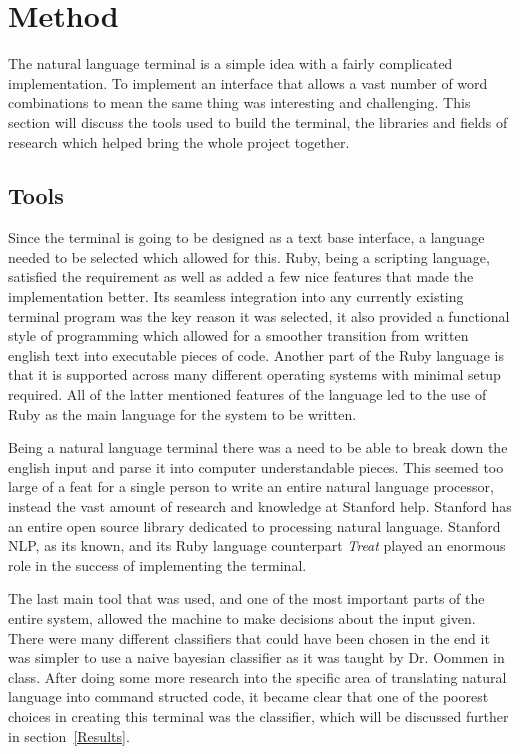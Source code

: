 \documentclass[12pt]{article}
\begin{document}
\section{Method}
\label{method}

The natural language terminal is a simple idea with a fairly complicated implementation. To implement an interface that allows a vast number of word combinations to mean the same thing was interesting and challenging. This section will discuss the tools used to build the terminal, the libraries and fields of research which helped bring the whole project together.

\subsection{Tools}

Since the terminal is going to be designed as a text base interface, a language needed to be selected which allowed for this. Ruby, being a scripting language, satisfied the requirement as well as added a few nice features that made the implementation better. Its seamless integration into any currently existing terminal program was the key reason it was selected, it also provided a functional style of programming which allowed for a smoother transition from written english text into executable pieces of code.\cite{matuszek} Another part of the Ruby language is that it is supported across many different operating systems with minimal setup required. All of the latter mentioned features of the language led to the use of Ruby as the main language for the system to be written.

Being a natural language terminal there was a need to be able to break down the english input and parse it into computer understandable pieces. This seemed too large of a feat for a single person to write an entire natural language processor, instead the vast amount of research and knowledge at Stanford help. Stanford has an entire open source library dedicated to processing natural language. Stanford NLP, as its known, and its Ruby language counterpart {\it Treat} played an enormous role in the success of implementing the terminal.

The last main tool that was used, and one of the most important parts of the entire system, allowed the machine to make decisions about the input given. There were many different classifiers that could have been chosen in the end it was simpler to use a naive bayesian classifier as it was taught by Dr. Oommen in class. After doing some more research into the specific area of translating natural language into command structed code\cite{matuszek}, it became clear that one of the poorest choices in creating this terminal was the classifier, which will be discussed further in section~\ref{Results}.
\end{document}
